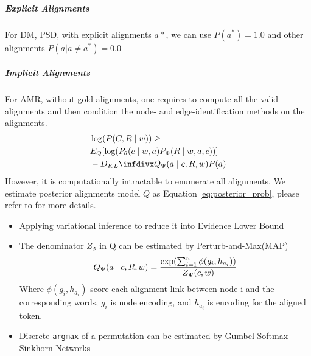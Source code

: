 \subparagraph{Explicit Alignments} For DM, PSD, with explicit
alignments $a*$, we can use $P(a^{*}) = 1.0$ and other
alignments $P(a | a \neq a^{*}) = 0.0 $

\subparagraph{Implicit Alignments} For AMR, without gold alignments,
one requires to compute all the valid alignments and then
condition the node- and edge-identification methods on the alignments.
\begin{equation}
 \label{eq:elbo}
\begin{aligned} \smaller[2]
  & \log(P(C,R \mid w)) \geq \\
  & E_{Q}[\log(P_{\theta}(c\mid w,a) P_{\Phi}(R\mid w,a,c))] \\
  & - \kld{Q_{\Psi}(a\mid c, R,w)}{P(a)}
\end{aligned}
\end{equation}
However, it is computationally intractable to enumerate all
alignments. We estimate posterior alignments model $Q$ as Equation \ref{eq:posterior_prob}, please refer to
\citet{lyu2018amr} for more details.

\begin{itemize}
\item Applying variational inference to reduce it into
  Evidence Lower Bound~\cite[ELBO,][]{kingma2013auto}
\item The denominator $Z_{\Psi}$ in Q can be estimated by Perturb-and-Max(MAP)~\cite{papandreouperturb}
\begin{equation}
  \label{eq:posterior_prob}
\begin{aligned} \smaller[2]
Q_{\Psi}(a\mid c, R,w)= \frac{\exp(\sum_{i=1}^{n} \phi(g_{i}, h_{a_{i}}))} {Z_{\Psi}(c,w)}
\end{aligned}
\end{equation}
Where $\phi(g_{i}, h_{a_{i}})$ score each alignment link between node i and the corresponding words,
$g_{i}$ is node encoding, and $h_{a_{i}}$ is encoding for the aligned token.

\item Discrete \texttt{argmax} of a permutation can be estimated by
  Gumbel-Softmax Sinkhorn Networks \cite{mena2018learning, lyu2018amr}
\end{itemize}


